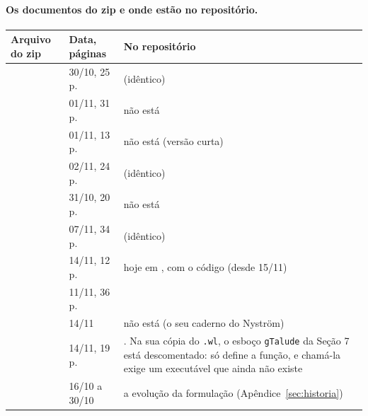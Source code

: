 \paragraph{Os documentos do zip e onde estão no repositório.}
\begin{center}\small
\begin{longtable}{@{}L{5.6cm} L{2.6cm} L{7.4cm}@{}}
\toprule
Arquivo do zip & Data, páginas & No repositório \\
\midrule
\endhead
{} & 30/10, 25 p. &  (idêntico) \\
 & 01/11, 31 p. & não está \\
 & 01/11, 13 p. & não está (versão curta) \\
 & 02/11, 24 p. &  (idêntico) \\
 & 31/10, 20 p. & não está \\
 & 07/11, 34 p. &  (idêntico) \\
 & 14/11, 12 p. & hoje em , com o código (desde 15/11) \\
 & 11/11, 36 p. &  \\
 & 14/11 & não está (o seu caderno do Nyström) \\
 & 14/11, 19 p. & . Na sua cópia do \texttt{.wl}, o esboço
  \texttt{gTalude} da Seção 7 está descomentado: só define a função, e chamá-la exige um executável que ainda não existe \\
 & 16/10 a 30/10 & a evolução da formulação (Apêndice~\ref{sec:historia}) \\
\bottomrule
\end{longtable}
\end{center}
